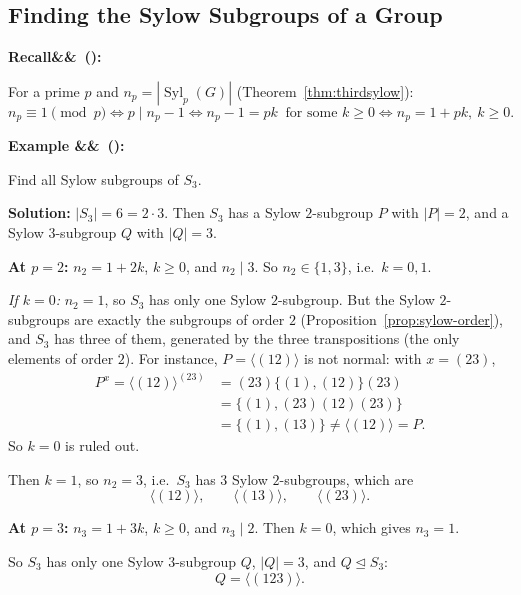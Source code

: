 \documentclass[11pt,a4paper]{article}
\DeclareMathOperator{\Syl}{Syl}
\newcounter{examplecnt}[section]
\newenvironment{example}[1][]{
	\stepcounter{examplecnt}
	\begin{examplebox}
		\textbf{\color{exampleColor}Example \arabic{examplecnt}\ifx&#1&\else\ (#1)\fi:} 
	}{
	\end{examplebox}
}
\newenvironment{recall}[1][]{
	\begin{recallbox}
		\textbf{\color{recallColor}Recall\ifx&#1&\else\ (#1)\fi:} 
	}{
	\end{recallbox}
}
\begin{document}
	\subsection{Finding the Sylow Subgroups of a Group}
	
	\begin{recall}
		For a prime $p$ and $n_p = |\Syl_p(G)|$ (Theorem~\ref{thm:thirdsylow}):
		\[
		n_p \equiv 1 \pmod{p} \iff p \mid n_p - 1 \iff n_p - 1 = pk \ \text{ for some } k \geq 0 \iff n_p = 1 + pk, \ k \geq 0.
		\]
	\end{recall}
	
	\begin{example}
		Find all Sylow subgroups of $S_3$.
		
		\vspace{0.5em}
		\noindent \textbf{Solution:} $|S_3| = 6 = 2 \cdot 3$. Then $S_3$ has a Sylow $2$-subgroup $P$ with $|P| = 2$, and a Sylow $3$-subgroup $Q$ with $|Q| = 3$.
		
		\vspace{0.5em}
		\noindent \textbf{At $p = 2$:} $n_2 = 1 + 2k$, $k \geq 0$, and $n_2 \mid 3$. So $n_2 \in \{1, 3\}$, i.e.\ $k = 0, 1$.
		
		\vspace{0.5em}
		\noindent \emph{If $k = 0$:} $n_2 = 1$, so $S_3$ has only one Sylow $2$-subgroup. But the Sylow $2$-subgroups are exactly the subgroups of order $2$ (Proposition~\ref{prop:sylow-order}), and $S_3$ has three of them, generated by the three transpositions (the only elements of order $2$). For instance, $P = \langle (12) \rangle$ is not normal: with $x = (23)$,
		\begin{align*}
			P^{x} = \langle (12) \rangle^{(23)} &= (23)\{(1), (12)\}(23)\\
			&= \{(1), (23)(12)(23)\}\\
			&= \{(1), (13)\} \neq \langle (12) \rangle = P.
		\end{align*}
		So $k = 0$ is ruled out.
		
		\vspace{0.5em}
		\noindent Then $k = 1$, so $n_2 = 3$, i.e.\ $S_3$ has $3$ Sylow $2$-subgroups, which are
		\[
		\langle (12) \rangle, \qquad \langle (13) \rangle, \qquad \langle (23) \rangle.
		\]
		
		\vspace{0.5em}
		\noindent \textbf{At $p = 3$:} $n_3 = 1 + 3k$, $k \geq 0$, and $n_3 \mid 2$. Then $k = 0$, which gives $n_3 = 1$.
		
		\vspace{0.5em}
		\noindent So $S_3$ has only one Sylow $3$-subgroup $Q$, $|Q| = 3$, and $Q \trianglelefteq S_3$:
		\[
		Q = \langle (123) \rangle.
		\]
	\end{example}
\end{document}
